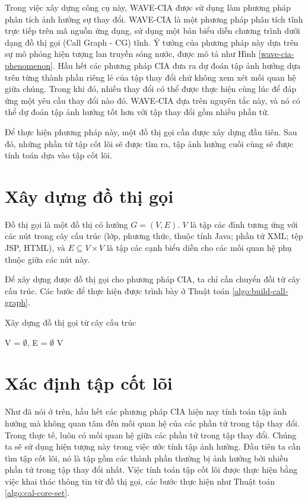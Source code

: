 \documentclass[12pt]{report}
\newenvironment{thuattoan}[1][h]
  {\renewcommand{\algorithmcfname}{Thuật toán}
   \begin{algorithm}[#1]
  }{\end{algorithm}}
\begin{document}
Trong việc xây dựng công cụ này, WAVE-CIA được sử dụng làm phương pháp phân tích ảnh hưởng sự thay đổi. WAVE-CIA là một phương pháp phân tích tĩnh trực tiếp trên mã nguồn ứng dụng, sử dụng một bản biểu diễn chương trình dưới dạng đồ thị gọi (Call Graph - CG) tĩnh. Ý tưởng của phương pháp này dựa trên sự mô phỏng hiện tượng lan truyền sóng nước, được mô tả như Hình \ref{wave-cia-phenomenon}. Hầu hết các phương pháp CIA đưa ra dự đoán tập ảnh hưởng dựa trên từng thành phần riêng lẻ của tập thay đổi chứ không xem xét mối quan hệ giữa chúng. Trong khi đó, nhiều thay đổi có thể được thực hiện cùng lúc để đáp ứng một yêu cầu thay đổi nào đó. WAVE-CIA dựa trên nguyên tắc này, và nó có thể dự đoán tập ảnh hưởng tốt hơn với tập thay đổi gồm nhiều phần tử.

Để thực hiện phương pháp này, một đồ thị gọi cần được xây dựng đầu tiên. Sau đó, những phần tử tập cốt lõi sẽ được tìm ra, tập ảnh hưởng cuối cùng sẽ được tính toán dựa vào tập cốt lõi.

\section{Xây dựng đồ thị gọi}
Đồ thị gọi là một đồ thị có hướng $G = (V, E)$. $V$ là tập các đỉnh tương ứng với các nút trong cây cấu trúc (lớp, phương thức, thuộc tính Java; phần tử XML; tệp JSP, HTML), và $E \subseteq V \times V$ là tập các cạnh biểu diễn cho các mối quan hệ phụ thuộc giữa các nút này.

Để xây dựng được đồ thị gọi cho phương pháp CIA, ta chỉ cần chuyển đồi từ cây cấu trúc. Các bước để thực hiện được trình bày ở Thuật toán \ref{algo:build-call-graph}.

\begin{thuattoan}
\label{algo:build-call-graph}
\caption{Xây dựng đồ thị gọi từ cây cấu trúc}
 V = $\emptyset$, E = $\emptyset$\;
  \Return V\;
\end{thuattoan}

\section{Xác định tập cốt lõi}
Như đã nói ở trên, hầu hết các phương pháp CIA hiện nay tính toán tập ảnh hưởng mà không quan tâm đến mối quan hệ của các phần tử trong tập thay đổi. Trong thực tế, luôn có mối quan hệ giữa các phần tử trong tập thay đổi. Chúng ta sẽ sử dụng hiện tượng này trong việc ước tính tập ảnh hưởng. Đầu tiên ta cần tìm tập cốt lõi, nó là tập gồm các thành phần thường bị ảnh hưởng bởi nhiều phần tử trong tập thay đổi nhất. Việc tính toán tập cốt lõi được thực hiện bằng việc khai thác thông tin từ đồ thị gọi, các bước thực hiện như Thuật toán \ref{algo:cal-core-set}.
\end{document}
